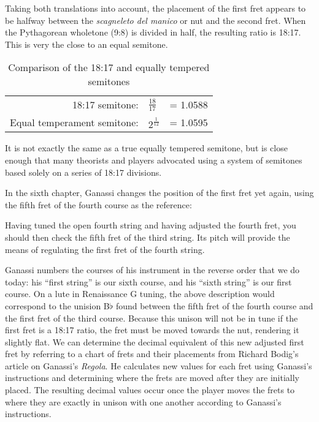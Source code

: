 Taking both translations into account, the placement of the first fret appears to be
halfway between the \textit{scagneleto del manico} or nut and the second fret. When
the Pythagorean wholetone (9:8) is divided in half, the resulting ratio is 18:17.
This is very the close to an equal semitone.
\begin{table}[h!]
  \begin{center}
  \begin{tabular}{ r l l }
    18:17 semitone:       & $ \frac{18}{17} $ & = 1.0588 \\
    Equal temperament semitone: & $ 2^\frac{1}{12} $ & = 1.0595 \\
  \end{tabular}
  \end{center}
  \caption{Comparison of the 18:17 and equally tempered semitones}
\end{table}
It is not exactly the same as a true equally tempered semitone, but is close enough
that many theorists and players advocated using a system of semitones based solely on a
series of 18:17 divisions.

In the sixth chapter, Ganassi changes the position of the first fret yet again,
using the fifth fret of the fourth course as the reference:
\begin{blocks}
Having tuned the open fourth string and having adjusted the fourth fret, you should
then check the fifth fret of the third string. Its pitch will provide the means of
regulating the first fret of the fourth string. \autocite[114]{RB:2}
\end{blocks}
Ganassi numbers the courses of his instrument in the reverse order that we do
today: his ``first string'' is our sixth course, and his ``sixth string'' is our
first course. On a lute in Renaissance G tuning, the above description would
correspond to the unision B$\flat$ found between the fifth fret of the fourth
course and the first fret of the third course. Because this unison will not be
in tune if the first fret is a 18:17 ratio, the fret must be moved towards the
nut, rendering it slightly flat. We can determine the decimal equivalent of
this new adjusted first fret by referring to a chart of frets and their
placements from Richard Bodig's article on Ganassi's \textit{Regola}.
\autocite[67]{RB:3} He calculates new values for each fret using Ganassi's
instructions and determining where the frets are moved after they are initially placed. The
resulting decimal values occur once the player moves the frets to where they are
exactly in unison with one another according to Ganassi's instructions.

